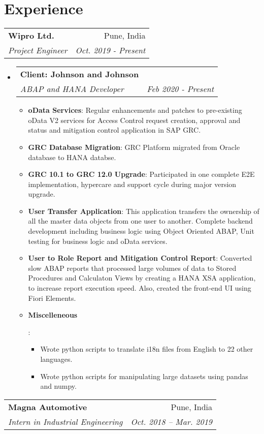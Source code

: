 \documentclass[a4,11pt]{article}
\makeatletter
\newcommand{\resumeItem}[2]{
  \item\small{
    \textbf{#1}{: #2 \vspace{-2pt}}
  }
}
\newcommand{\resumeCompany}[4]{
    \begin{tabular*}{0.99\textwidth}[t]{l@{\extracolsep{\fill}}r}
      \textbf{#1} & #2 \\
      \textit{\small#3} & \textit{\small #4} \\
    \end{tabular*}\vspace{-5pt}
}
\newcommand{\resumeSubheading}[4]{
  \vspace{-1pt}\item
    \begin{tabular*}{0.97\textwidth}[t]{l@{\extracolsep{\fill}}r}
      \textbf{#1} & #2 \\
      \textit{\small#3} & \textit{\small #4} \\
    \end{tabular*}\vspace{-5pt}
}
\newcommand{\resumeSubSubheading}[2]{
    \begin{tabular*}{0.97\textwidth}{l@{\extracolsep{\fill}}r}
      \textit{\small#1} & \textit{\small #2} \\
    \end{tabular*}\vspace{-5pt}
}
\newcommand{\resumeSubHeadingListStart}{\begin{itemize}[leftmargin=*]}
\newcommand{\resumeSubHeadingListEnd}{\end{itemize}}
\newcommand{\resumeItemListStart}{\begin{itemize}}
\newcommand{\resumeItemListEnd}{\end{itemize}\vspace{-5pt}}
\makeatother
\begin{document}
\section{Experience}
	\resumeCompany
      {Wipro Ltd.}{Pune, India}
      {Project Engineer}{Oct. 2019 - Present}
		\resumeSubHeadingListStart
		\resumeSubheading
		  {Client: Johnson and Johnson}{}
		  {ABAP and HANA Developer}{Feb 2020 - Present}
			\resumeItemListStart
				\resumeItem{oData Services}
				  {Regular enhancements and patches to pre-existing oData V2 services for Access Control request creation, approval and status and mitigation control application in SAP GRC.}
				\resumeItem{GRC Database Migration}
				  {GRC Platform migrated from Oracle database to HANA databse.}
				\resumeItem{GRC 10.1 to GRC 12.0 Upgrade}
				  {Participated in one complete E2E implementation, hypercare and support cycle during major version upgrade.}
				\resumeItem{User Transfer Application}
				  {This application transfers the ownership of all the master data objects from one user to another. Complete backend development including business logic using Object Oriented ABAP, Unit testing for business logic and oData services.}
				\resumeItem{User to Role Report and Mitigation Control Report} 
				  {Converted slow ABAP reports that processed large volumes of data to Stored Procedures and Calculaton Views by creating a HANA XSA application, to increase report execution speed. Also, created the front-end UI using Fiori Elements.}
				\resumeItem{Miscelleneous}
				  {
					\begin{itemize}
						\item Wrote python scripts to translate i18n files from English to 22 other languages.
						\item Wrote python scripts for manipulating large datasets using pandas and numpy.
					\end{itemize}
				  }
			\resumeItemListEnd
		\resumeSubHeadingListEnd
	\resumeCompany
		{Magna Automotive}{Pune, India}
		{Intern in Industrial Engineering}{Oct. 2018 -- Mar. 2019}
      


\end{document}
